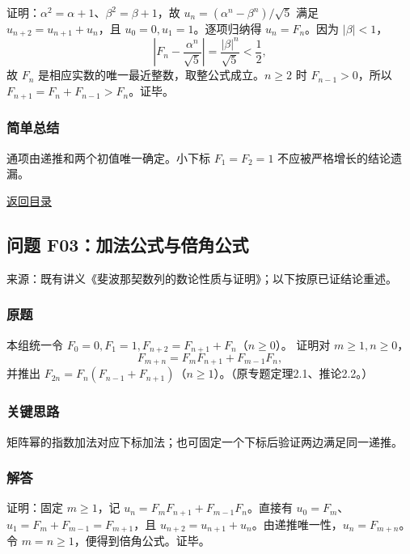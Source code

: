 \documentclass[11pt,a4paper]{article}
\begin{document}
证明：\(\alpha^2=\alpha+1\)、\(\beta^2=\beta+1\)，故
\(u_n=(\alpha^n-\beta^n)/\sqrt5\) 满足 \(u_{n+2}=u_{n+1}+u_n\)，且
\(u_0=0,u_1=1\)。逐项归纳得 \(u_n=F_n\)。因为 \(|\beta|<1\)，
\[\left|F_n-\frac{\alpha^n}{\sqrt5}\right|=\frac{|\beta|^n}{\sqrt5}<\frac12,\]
故 \(F_n\) 是相应实数的唯一最近整数，取整公式成立。\(n\ge2\) 时
\(F_{n-1}>0\)，所以 \(F_{n+1}=F_n+F_{n-1}>F_n\)。证毕。

\subsubsection{简单总结}\label{ux7b80ux5355ux603bux7ed3-34}

通项由递推和两个初值唯一确定。小下标 \(F_1=F_2=1\)
不应被严格增长的结论遗漏。

\noindent\hyperref[contents]{返回目录}

\subsection{问题
F03：加法公式与倍角公式}\label{ux95eeux9898-f03ux52a0ux6cd5ux516cux5f0fux4e0eux500dux89d2ux516cux5f0f}

来源：既有讲义《斐波那契数列的数论性质与证明》；以下按原已证结论重述。

\subsubsection{原题}\label{ux539fux9898-35}

本组统一令 \(F_0=0,F_1=1,F_{n+2}=F_{n+1}+F_n\)（\(n\ge0\)）。 证明对
\(m\ge1,n\ge0\)， \[F_{m+n}=F_mF_{n+1}+F_{m-1}F_n,\] 并推出
\(F_{2n}=F_n(F_{n-1}+F_{n+1})\)（\(n\ge1\)）。（原专题定理2.1、推论2.2。）

\subsubsection{关键思路}\label{ux5173ux952eux601dux8def-35}

矩阵幂的指数加法对应下标加法；也可固定一个下标后验证两边满足同一递推。

\subsubsection{解答}\label{ux89e3ux7b54-35}

证明：固定 \(m\ge1\)，记 \(u_n=F_mF_{n+1}+F_{m-1}F_n\)。直接有
\(u_0=F_m\)、\(u_1=F_m+F_{m-1}=F_{m+1}\)，且
\(u_{n+2}=u_{n+1}+u_n\)。由递推唯一性，\(u_n=F_{m+n}\)。令
\(m=n\ge1\)，便得到倍角公式。证毕。
\end{document}
